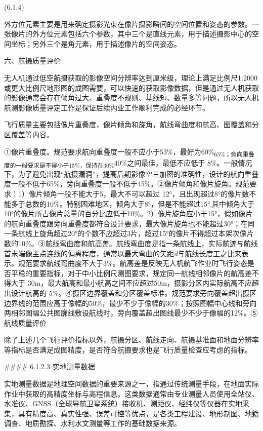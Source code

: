 (6.1.4)

外方位元素主要是用来确定摄影光束在像片摄影瞬间的空间位置和姿态的参数。一张像片的外方位元素包括六个参数，其中三个是直线元素，用于描述摄影中心的空间坐标；另外三个是角元素，用于描述像片的空间姿态。

六、航摄质量评价

无人机通过低空航摄获取的影像空间分辨率达到厘米级，理论上满足比例尺1:2000 或更大比例尺地形图的成图需要，可以快速的获取影像数据，但是通过无人机获取的影像通常会存在倾角过大、重叠度不规则、基线短、数量多等问题，所以无人机航测影像质量评定工作是保证后续内业工作顺利完成的必经环节。

飞行质量主要包括像片重叠度，像片倾角和旋角，航线弯曲度和航高、图覆盖和分区覆盖等内容。

①像片重叠度。规范要求航向重叠度一般不应小于53\%，最好为60\%\textsubscript{65\%；旁向重叠度的一般要求是不得小于15\%，保持在30\%}40\%之间最佳，最低不应低于 8\%。一般情况下，为了避免出现``航摄漏洞''，提高后期影像空三加密的准确性，设计的航向重叠度一般不低于65\%，旁向重叠度一般不低于45\%。②像片倾角和像片旋角。规范要求：1）像片倾角一般不能大于5，最大不可以超过 12°，且出现超过8°的像片数不能多于总数的10\%。特别困难地区，倾角大于8°，但是不能超过15°,其中倾角大于10°的像片所占像片总量的百分比应低于10\%。2）像片旋角应小于15°，假如像片的航向重叠度跟旁向重叠度都符合设计要求，最大像片旋角也不能超过30°；在同一条航线上旋角超过20°的个数不应超过3片，超过15°的像片不得超过本架次像片数的10\%。③航线弯曲度和航高差。航线弯曲度是指一条航线上，实际航迹与航线首末端像主点连线的偏离程度，通常以最大弯曲的矢距\emph{d}与航线长度工之比来表示。规范要求航线弯曲度不大于3\%。航高差是反映无人机航飞作业时飞行姿态是否平稳的重要指标，对于中小比例尺测图要求，规定同一航线相邻像片的航高差不得大于 30m，最大航高和最小航高之间不应超过50m，摄影分区内实际航高不应超出设计航高的 5\%。④摄区边界覆盖和分区覆盖标准。规范要求旁向覆盖超出摄区边界线的范围应高于像幅的50\%，最少不少于像幅的30\%；按照图幅中心线和旁向两相邻图幅公共图廓线敷设航线时，旁向覆盖超出图线最少不少于像幅的12\%。⑤航线质量评价

除了上述几个飞行评价指标以外，航摄分区、航线走向、航摄基准面和地面分辨率等指标是否满足成图精度，是否符合航摄要求也是飞行质量检查应考虑的指标。

\#\#\#\# 6.1.2.3 实地测量数据

实地测量数据是地理空间数据的重要来源之一，指通过传统测量手段，在地面实际作业中获取的高精度坐标与高程信息。这类数据通常由专业测量人员使用全站仪、水准仪、GNSS（全球导航卫星系统）接收机、测距仪、经纬仪等仪器在实地采集，具有精度高、真实性强、误差可控等优点，是各类工程建设、地形制图、地籍调查、地质勘探、水利水文测量等工作的基础数据来源。

